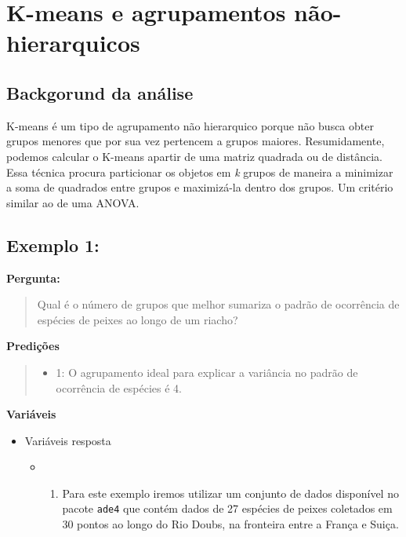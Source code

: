 \documentclass[
]{book}
\providecommand{\tightlist}{%
  \setlength{\itemsep}{0pt}\setlength{\parskip}{0pt}}
\begin{document}
\hypertarget{k-means-e-agrupamentos-nuxe3o-hierarquicos}{%
\chapter{K-means e agrupamentos não-hierarquicos}\label{k-means-e-agrupamentos-nuxe3o-hierarquicos}}

\hypertarget{backgorund-da-anuxe1lise-1}{%
\section{Backgorund da análise}\label{backgorund-da-anuxe1lise-1}}

K-means é um tipo de agrupamento não hierarquico porque não busca obter grupos menores que por sua vez pertencem a grupos maiores. Resumidamente, podemos calcular o K-means apartir de uma matriz quadrada ou de distância. Essa técnica procura particionar os objetos em \emph{k} grupos de maneira a minimizar a soma de quadrados entre grupos e maximizá-la dentro dos grupos. Um critério similar ao de uma ANOVA.

\hypertarget{exemplo-1-1}{%
\section{Exemplo 1:}\label{exemplo-1-1}}

\textbf{Pergunta:}

\begin{quote}
Qual é o número de grupos que melhor sumariza o padrão de ocorrência de espécies de peixes ao longo de um riacho?
\end{quote}

\textbf{Predições}

\begin{quote}
\begin{itemize}
\tightlist
\item
  1: O agrupamento ideal para explicar a variância no padrão de ocorrência de espécies é 4.
\end{itemize}
\end{quote}

\textbf{Variáveis}

\begin{itemize}
\tightlist
\item
  Variáveis resposta

  \begin{itemize}
  \item
    \begin{enumerate}
    \def\labelenumi{\arabic{enumi}.}
    \tightlist
    \item
      Para este exemplo iremos utilizar um conjunto de dados disponível no pacote \texttt{ade4} que contém dados de 27 espécies de peixes coletados em 30 pontos ao longo do Rio Doubs, na fronteira entre a França e Suiça.
    \end{enumerate}
  \end{itemize}
\end{itemize}
\end{document}
